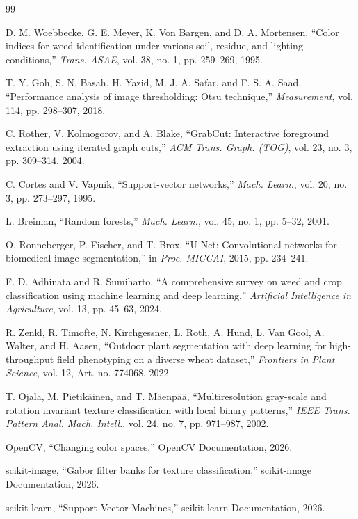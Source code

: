 \documentclass[conference]{IEEEtran}
\begin{document}
\begin{thebibliography}{99}

D. M. Woebbecke, G. E. Meyer, K. Von Bargen, and D. A. Mortensen,
“Color indices for weed identification under various soil, residue, and lighting conditions,”
\textit{Trans. ASAE}, vol. 38, no. 1, pp. 259--269, 1995.

T. Y. Goh, S. N. Basah, H. Yazid, M. J. A. Safar, and F. S. A. Saad,
“Performance analysis of image thresholding: Otsu technique,”
\textit{Measurement}, vol. 114, pp. 298--307, 2018.

C. Rother, V. Kolmogorov, and A. Blake,
“GrabCut: Interactive foreground extraction using iterated graph cuts,”
\textit{ACM Trans. Graph. (TOG)}, vol. 23, no. 3, pp. 309--314, 2004.

C. Cortes and V. Vapnik,
“Support-vector networks,”
\textit{Mach. Learn.}, vol. 20, no. 3, pp. 273--297, 1995.

L. Breiman,
“Random forests,”
\textit{Mach. Learn.}, vol. 45, no. 1, pp. 5--32, 2001.

O. Ronneberger, P. Fischer, and T. Brox,
“U-Net: Convolutional networks for biomedical image segmentation,”
in \textit{Proc. MICCAI}, 2015, pp. 234--241.

F. D. Adhinata and R. Sumiharto,
“A comprehensive survey on weed and crop classification using machine learning and deep learning,”
\textit{Artificial Intelligence in Agriculture}, vol. 13, pp. 45--63, 2024.


R. Zenkl, R. Timofte, N. Kirchgessner, L. Roth, A. Hund, L. Van Gool, A. Walter, and H. Aasen,
“Outdoor plant segmentation with deep learning for high-throughput field phenotyping on a diverse wheat dataset,”
\textit{Frontiers in Plant Science}, vol. 12, Art. no. 774068, 2022.

T. Ojala, M. Pietikäinen, and T. Mäenpää,
“Multiresolution gray-scale and rotation invariant texture classification with local binary patterns,”
\textit{IEEE Trans. Pattern Anal. Mach. Intell.}, vol. 24, no. 7, pp. 971--987, 2002.

OpenCV,
“Changing color spaces,”
OpenCV Documentation, 2026.

scikit-image,
“Gabor filter banks for texture classification,”
scikit-image Documentation, 2026.

scikit-learn,
“Support Vector Machines,”
scikit-learn Documentation, 2026.



\end{thebibliography}
\end{document}
